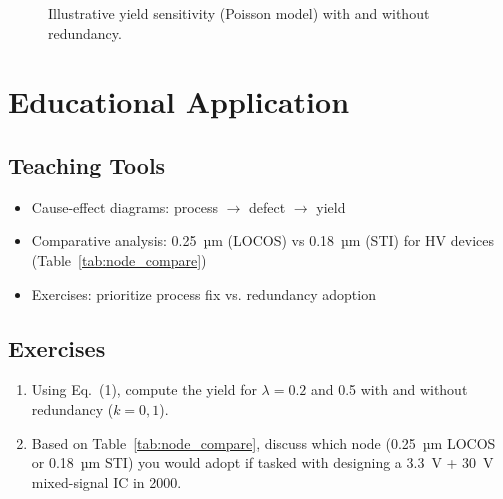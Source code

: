 \documentclass[conference]{IEEEtran}
\begin{document}
\begin{figure}[!t]
  \centering
  \caption{Illustrative yield sensitivity (Poisson model) with and without redundancy.}
  \label{fig:yield}
\end{figure}

\section{Educational Application}
\subsection{Teaching Tools}
\begin{itemize}
    \item Cause-effect diagrams: process $\rightarrow$ defect $\rightarrow$ yield
    \item Comparative analysis: 0.25~µm (LOCOS) vs 0.18~µm (STI) for HV devices (Table~\ref{tab:node_compare})
    \item Exercises: prioritize process fix vs. redundancy adoption
\end{itemize}

\subsection{Exercises}
\begin{enumerate}
  \item Using Eq.~(1), compute the yield for $\lambda=0.2$ and 0.5 with and without redundancy ($k=0,1$).
  \item Based on Table~\ref{tab:node_compare}, discuss which node (0.25~µm LOCOS or 0.18~µm STI) you would adopt if tasked with designing a 3.3~V + 30~V mixed-signal IC in 2000.
\end{enumerate}
\end{document}

